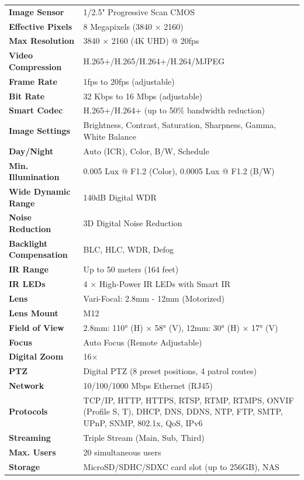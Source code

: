 \documentclass[11pt,a4paper]{article}
\begin{document}
{\begin{longtable}{@{}p{4cm}X@{}}
\textbf{Image Sensor} & 1/2.5" Progressive Scan CMOS \\
\textbf{Effective Pixels} & 8 Megapixels (3840 × 2160) \\
\textbf{Max Resolution} & 3840 × 2160 (4K UHD) @ 20fps \\
\textbf{Video Compression} & H.265+/H.265/H.264+/H.264/MJPEG \\
\textbf{Frame Rate} & 1fps to 20fps (adjustable) \\
\textbf{Bit Rate} & 32 Kbps to 16 Mbps (adjustable) \\
\textbf{Smart Codec} & H.265+/H.264+ (up to 50\% bandwidth reduction) \\
\textbf{Image Settings} & Brightness, Contrast, Saturation, Sharpness, Gamma, White Balance \\
\textbf{Day/Night} & Auto (ICR), Color, B/W, Schedule \\
\textbf{Min. Illumination} & 0.005 Lux @ F1.2 (Color), 0.0005 Lux @ F1.2 (B/W) \\
\textbf{Wide Dynamic Range} & 140dB Digital WDR \\
\textbf{Noise Reduction} & 3D Digital Noise Reduction \\
\textbf{Backlight Compensation} & BLC, HLC, WDR, Defog \\
\textbf{IR Range} & Up to 50 meters (164 feet) \\
\textbf{IR LEDs} & 4 × High-Power IR LEDs with Smart IR \\
\textbf{Lens} & Vari-Focal: 2.8mm - 12mm (Motorized) \\
\textbf{Lens Mount} & M12 \\
\textbf{Field of View} & 2.8mm: 110° (H) × 58° (V), 12mm: 30° (H) × 17° (V) \\
\textbf{Focus} & Auto Focus (Remote Adjustable) \\
\textbf{Digital Zoom} & 16× \\
\textbf{PTZ} & Digital PTZ (8 preset positions, 4 patrol routes) \\
\textbf{Network} & 10/100/1000 Mbps Ethernet (RJ45) \\
\textbf{Protocols} & TCP/IP, HTTP, HTTPS, RTSP, RTMP, RTMPS, ONVIF (Profile S, T), DHCP, DNS, DDNS, NTP, FTP, SMTP, UPnP, SNMP, 802.1x, QoS, IPv6 \\
\textbf{Streaming} & Triple Stream (Main, Sub, Third) \\
\textbf{Max. Users} & 20 simultaneous users \\
\textbf{Storage} & MicroSD/SDHC/SDXC card slot (up to 256GB), NAS \\

\end{longtable}}
\end{document}
